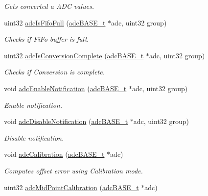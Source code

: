 \begin{DoxyCompactItemize}
\begin{DoxyCompactList}\small\item\em Gets converted a A\+DC values. \end{DoxyCompactList}\item 
uint32 \mbox{\hyperlink{group__ADC_gac6acf1ea1f92864df632f2aed46d7dd9}{adc\+Is\+Fifo\+Full}} (\mbox{\hyperlink{reg__adc_8h_ab98b3b090eb1fd96596cd337a5fc0a4e}{adc\+B\+A\+S\+E\+\_\+t}} $\ast$adc, uint32 group)
\begin{DoxyCompactList}\small\item\em Checks if Fi\+Fo buffer is full. \end{DoxyCompactList}\item 
uint32 \mbox{\hyperlink{group__ADC_ga8bad75e5bea34cb9eaec0ca8a3cb6dcb}{adc\+Is\+Conversion\+Complete}} (\mbox{\hyperlink{reg__adc_8h_ab98b3b090eb1fd96596cd337a5fc0a4e}{adc\+B\+A\+S\+E\+\_\+t}} $\ast$adc, uint32 group)
\begin{DoxyCompactList}\small\item\em Checks if Conversion is complete. \end{DoxyCompactList}\item 
void \mbox{\hyperlink{group__ADC_ga986956885288c1d13a7e9917a900b7ec}{adc\+Enable\+Notification}} (\mbox{\hyperlink{reg__adc_8h_ab98b3b090eb1fd96596cd337a5fc0a4e}{adc\+B\+A\+S\+E\+\_\+t}} $\ast$adc, uint32 group)
\begin{DoxyCompactList}\small\item\em Enable notification. \end{DoxyCompactList}\item 
void \mbox{\hyperlink{group__ADC_gacbc69ac57562cbc2f607171801fb7138}{adc\+Disable\+Notification}} (\mbox{\hyperlink{reg__adc_8h_ab98b3b090eb1fd96596cd337a5fc0a4e}{adc\+B\+A\+S\+E\+\_\+t}} $\ast$adc, uint32 group)
\begin{DoxyCompactList}\small\item\em Disable notification. \end{DoxyCompactList}\item 
void \mbox{\hyperlink{group__ADC_ga6f24721d9ed4247b69f1f818585253f0}{adc\+Calibration}} (\mbox{\hyperlink{reg__adc_8h_ab98b3b090eb1fd96596cd337a5fc0a4e}{adc\+B\+A\+S\+E\+\_\+t}} $\ast$adc)
\begin{DoxyCompactList}\small\item\em Computes offset error using Calibration mode. \end{DoxyCompactList}\item 
uint32 \mbox{\hyperlink{group__ADC_ga6197438221bd189905b1a86a35272842}{adc\+Mid\+Point\+Calibration}} (\mbox{\hyperlink{reg__adc_8h_ab98b3b090eb1fd96596cd337a5fc0a4e}{adc\+B\+A\+S\+E\+\_\+t}} $\ast$adc)

\end{DoxyCompactItemize}
